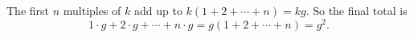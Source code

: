 The first $n$ multiples of $k$ add up to $k(1+2+\cdots+n)=kg$. So the final total is
\[1\cdot g+2\cdot g+\cdots+n\cdot g=g(1+2+\cdots+n)=\boxed{g^2}.\]
